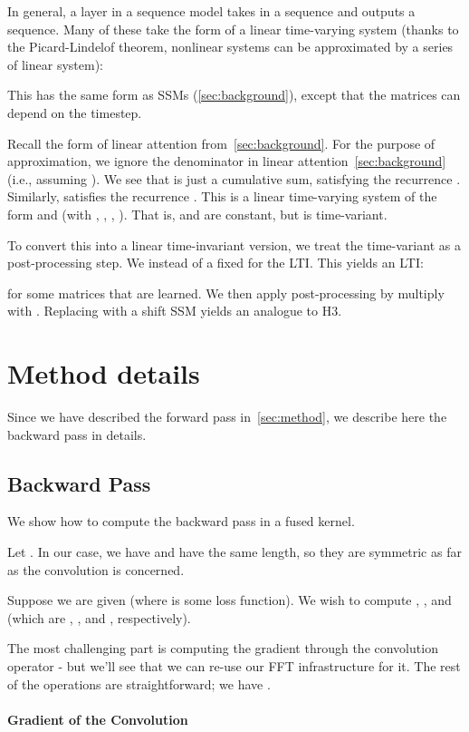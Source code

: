 \documentclass{article}
\newcommand{\hthree}{\textsc{H3}\xspace}
\begin{document}
In general, a layer in a sequence model takes in a sequence and outputs a
sequence.
Many of these take the form of a linear time-varying system (thanks to the
Picard-Lindelof theorem, nonlinear systems can be approximated by a series of
linear system):

This has the same form as SSMs (\cref{sec:background}), except that the matrices
can depend on the timestep.

Recall the form of linear attention from~\cref{sec:background}.
For the purpose of approximation, we ignore the denominator in linear
attention~\cref{sec:background} (i.e., assuming ).
We see that  is just a cumulative sum, satisfying the recurrence .
Similarly,  satisfies the recurrence .
This is a linear time-varying system of the form  and
 (with , , ,
).
That is,  and  are constant, but  is time-variant.

To convert this into a linear time-invariant version, we treat the time-variant  as a post-processing step.
We instead of a fixed  for the LTI.
This yields an LTI:

for some matrices  that are learned.
We then apply post-processing by multiply  with .
Replacing  with a shift SSM yields an analogue to \hthree.
 \section{Method details}
\label{sec:method_details}

Since we have described the forward pass in~\cref{sec:method}, we describe here
the backward pass in details.

\subsection{Backward Pass}
We show how to compute the backward pass in a fused kernel.


Let .
In our case, we have  and  have the same length, so they are symmetric as far as the convolution is concerned.

Suppose we are given  (where  is some loss function).
We wish to compute , , and  (which are , , and , respectively).

The most challenging part is computing the gradient through the convolution operator - but we'll see that we can re-use our FFT infrastructure for it.
The rest of the operations are straightforward; we have .

\paragraph{Gradient of the Convolution}
\end{document}
